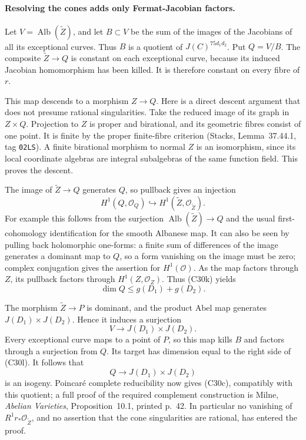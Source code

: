 \documentclass[11pt]{article}
\theoremstyle{definition}\newtheorem{definition}[theorem]{Definition}\newtheorem{remark}[theorem]{Remark}
\begin{document}
\paragraph{Resolving the cones adds only Fermat-Jacobian factors.}
Let $V=\operatorname{Alb}(\widetilde Z)$, and let
$B\subset V$ be the sum of the images of the
Jacobians of all its exceptional curves.  Thus $B$
is a quotient of $J(C)^{75d_1d_2}$.  Put $Q=V/B$.
The composite $\widetilde Z\to Q$ is constant on
each exceptional curve, because its induced Jacobian
homomorphism has been killed.  It is therefore constant
on every fibre of $r$.

This map descends to a morphism $Z\to Q$.  Here is
a direct descent argument that does not presume
rational singularities.  Take the reduced image of
its graph in $Z\times Q$.  Projection to $Z$ is
proper and birational, and its geometric fibres
consist of one point.  It is finite by the proper
finite-fibre criterion (Stacks, Lemma~37.44.1,
tag \texttt{02LS}).  A finite birational morphism
to normal $Z$ is an isomorphism, since its local
coordinate algebras are integral subalgebras of
the same function field.  This proves the descent.

The image of $\widetilde Z\to Q$ generates $Q$,
so pullback gives an injection
\[
         H^1(Q,\mathcal O_Q)
                         \hookrightarrow H^1(\widetilde Z,
                                                      \mathcal O_{\widetilde Z}).
\]
For example this follows from the surjection
$\operatorname{Alb}(\widetilde Z)\to Q$ and the
usual first-cohomology identification for the smooth
Albanese map.  It can also be seen by pulling back
holomorphic one-forms: a finite sum of differences
of the image generates a dominant map to $Q$, so
a form vanishing on the image must be zero; complex
conjugation gives the assertion for $H^1(\mathcal O)$.
As the map factors through $Z$, its pullback factors
through $H^1(Z,\mathcal O_Z)$.  Thus (C30k) yields
\[
                      \dim Q\leq g(D_1)+g(D_2).
                                                        \tag{C30l}
\]

The morphism $\widetilde Z\to P$ is dominant, and
the product Abel map generates
$J(D_1)\times J(D_2)$.  Hence it induces a surjection
\[
                    V\longrightarrow J(D_1)\times J(D_2).
\]
Every exceptional curve maps to a point of $P$, so
this map kills $B$ and factors through a surjection
from $Q$.  Its target has dimension equal to the
right side of (C30l).  It follows that
\[
                       Q\longrightarrow J(D_1)\times J(D_2)
\]
is an isogeny.  Poincar\'e complete reducibility now
gives (C30c), compatibly with this quotient; a full
proof of the required complement construction is
Milne, \emph{Abelian Varieties}, Proposition~10.1,
printed p.~42.  In particular no vanishing of
$R^1r_*\mathcal O_{\widetilde Z}$, and no assertion
that the cone singularities are rational, has entered
the proof.
\end{document}

